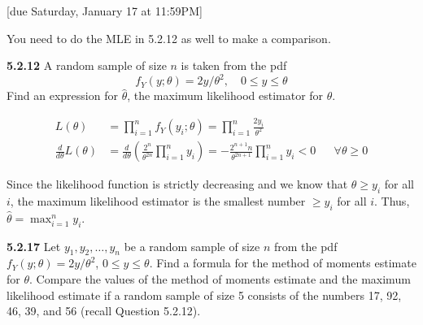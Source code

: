\documentclass{article}
\begin{document}
[due Saturday, January 17 at 11:59PM]

\begin{probset}

\begin{prob}
    You need to do the MLE in 5.2.12 as well to make a comparison.

    \begin{subprobset}
        \begin{subprob}
            \textbf{5.2.12} A random sample of size $n$ is taken from the pdf
            \[
                f_Y(y; \theta) = 2y/\theta^2, \quad 0 \leq y \leq \theta
            \]
            Find an expression for $\hat\theta$, the maximum likelihood estimator for $\theta$.

            \begin{soln}
                \begin{align*}
                    L(\theta) &= \prod_{i=1}^n f_Y(y_i; \theta) = \prod_{i=1}^n \frac{2y_i}{\theta^2} \\
                    \frac{d}{d\theta} L(\theta) &= \frac{d}{d\theta} \left( \frac{2^n}{\theta^{2n}} \prod_{i=1}^n y_i \right) = -\frac{2^{n+1}n}{\theta^{2n+1}} \prod_{i=1}^n y_i < 0 && \forall \theta \geq 0
                \end{align*}

                Since the likelihood function is strictly decreasing and we know that $\theta \geq y_i$ for all $i$, the maximum likelihood estimator is the smallest number $\geq y_i$ for all $i$. Thus, $\hat\theta = \max_{i=1}^n y_i$.
            \end{soln}
        \end{subprob}
        
        \begin{subprob}
            \textbf{5.2.17}  Let $y_1, y_2, \ldots, y_n$ be a random sample of size $n$ from the pdf $f_Y(y; \theta) = 2y/\theta^2$, $0 \leq y \leq \theta$. Find a formula for the method of moments estimate for $\theta$. Compare the values of the method of moments estimate and the maximum likelihood estimate if a random sample of size 5 consists of the numbers 17, 92, 46, 39, and 56 (recall Question 5.2.12).


\end{subprob}
\end{subprobset}
\end{prob}
\end{probset}
\end{document}
